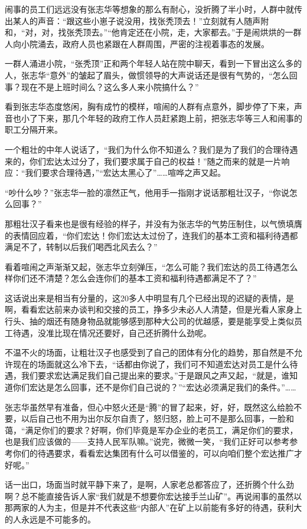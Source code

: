 闹事的员工们远远没有张志华等想象的那么有耐心，没折腾了半小时，人群中就传出某人的声音：“跟这些小崽子说没用，找张秃顶去！”立刻就有人随声附和，“对，对，找张秃顶去。”“他肯定还在小院，走，大家都去。”于是闹烘烘的一群人向小院涌去，政府人员也紧跟在人群周围，严密的注视着事态的发展。

一群人涌进小院，“张秃顶”正和两个年轻人站在院中聊天，看到一下冒出这么多的人，张志华“意外”的皱起了眉头，做惯领导的大声说话还是很有气势的，“怎么回事？现在不是上班时间么？这么多人来小院搞什么？”

看到张志华态度悠闲，胸有成竹的模样，喧闹的人群有点意外，脚步停了下来，声音也小了下来，那几个年轻的政府工作人员赶紧跑上前，把张志华等三人和闹事的职工分隔开来。

一个粗壮的中年人说话了，“我们为什么你不知道么？我们是为了我们的合理待遇来的，你们宏达太过分了，我们要求属于自己的权益！”随之而来的就是一片响应：“我们要求合理待遇，”“宏达太黑心了”……喧哗之声又起。

“吵什么吵？”张志华一脸的凛然正气，他用手一指刚才说话那粗壮汉子，“你说怎么回事？”

那粗壮汉子看来也是很有经验的样子，并没有为张志华的气势压制住，以气愤填膺的表情回应着，“你们宏达！你们宏达太过份了，连我们的基本工资和福利待遇都满足不了，转制以后我们喝西北风去么？”

看着喧闹之声渐渐又起，张志华立刻弹压，“怎么可能？我们宏达的员工待遇怎么样你们还不清楚？怎么会连你们的基本工资和福利待遇都满足不了？”

这话说出来是相当有分量的，这20多人中明显有几个已经出现的迟疑的表情，是啊，看看宏达前来办谈判和交接的员工，挣多少未必人人清楚，但是光看人家身上行头、抽的烟还有随身物品就能够感到那种大公司的优越感，要是能享受上类似员工待遇，没准比现在情况还要好，自己还折腾什么劲呢。

不温不火的场面，让粗壮汉子也感受到了自己的团体有分化的趋势，那自然是不允许现在的场面就这么冷下去，“话都由你说了，我们可不知道宏达对员工是什么待遇，我们要求宏达满足我们自己提出来的要求。”于是跟风之声又起，“就是，谁知道你们宏达是怎么回事，还不是你们自己说的？”“宏达必须满足我们的条件。”……

张志华虽然早有准备，但心中怒火还是“腾”的冒了起来，好，好，既然这么给脸不要，以后自己也不用为出尔反尔自责了，怒归怒，脸上可不是那么回事，一脸和蔼，“满足你们的要求？好啊，你们毕竟是军办企业的老员工，满足你们的要求，也是我们应该做的——支持人民军队嘛。”说完，微微一笑，“我们正好可以参考参考你们的待遇要求，看看宏达集团有什么可以借鉴的，可以向咱们整个宏达推广才好呢。”

话一出口，场面当时就平静下来了，是啊，人家老总都答应了，还折腾个什么劲啊？总不能直接告诉人家“我们就是不想要你宏达接手兰山矿”。再说闹事的虽然以那两家的人为主，但是并不代表这些“内部人”在矿上以前能有多好的待遇，获利大的人永远是不可能多的。

